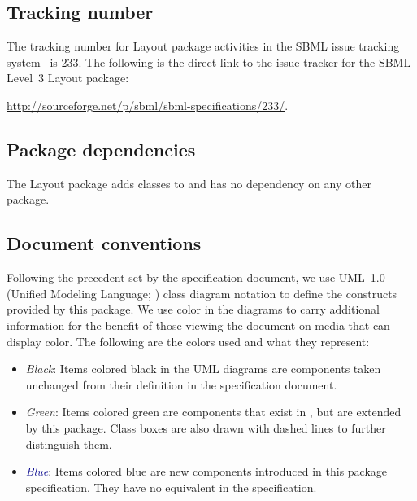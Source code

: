 \subsection{Tracking number}

The tracking number for Layout package activities in the SBML issue
tracking system~\citep{tracker} is 233.  The following is the direct link
to the issue tracker for the SBML Level~3 Layout package:
\begin{center}
  \url{http://sourceforge.net/p/sbml/sbml-specifications/233/}.
\end{center}

\subsection{Package dependencies}

The Layout package adds classes to \sbmlthreecore and has no 
dependency on any other package.


\subsection{Document conventions}

\label{conventions}

Following the precedent set by the \sbmlthreecore specification
document, we use UML~1.0 (Unified Modeling Language;
\citealt{eriksson:1998,oestereich:1999}) class diagram notation to
define the constructs provided by this package.  We use color in
the diagrams to carry additional information for the benefit of those
viewing the document on media that can display color.  The following are
the colors used and what they represent:

\begin{itemize}

\item[\raisebox{2.75pt}{\colorbox{black}{\rule{0.8pt}{0.8pt}}}]
  \emph{Black}: Items colored black in the UML diagrams are components
  taken unchanged from their definition in the \sbmlthreecore
  specification document.

\item[\raisebox{2.75pt}{\colorbox{mediumgreen}{\rule{0.8pt}{0.8pt}}}]
  \emph{\textcolor{mediumgreen}{Green}}: Items colored green are
  components that exist in \sbmlthreecore, but are extended by this
  package.  Class boxes are also drawn with dashed lines to further
  distinguish them.

\item[\raisebox{2.75pt}{\colorbox{darkblue}{\rule{0.8pt}{0.8pt}}}]
  \emph{\textcolor{darkblue}{Blue}}: Items colored blue are new
  components introduced in this package specification.  They have no
  equivalent in the \sbmlthreecore specification.

\end{itemize}

